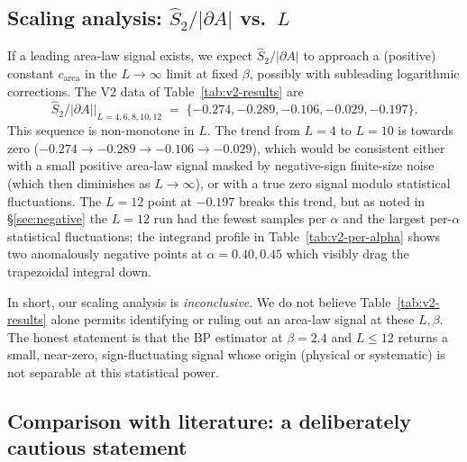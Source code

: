 \documentclass[11pt,a4paper]{article}
\theoremstyle{definition}
\begin{document}
\subsection{Scaling analysis: $\widehat S_2/|\partial A|$ vs.\ $L$}
\label{sec:scaling-v2}

If a leading area-law signal exists, we expect $\widehat
S_2/|\partial A|$ to approach a (positive) constant $c_{\mathrm{area}}$
in the $L \to \infty$ limit at fixed $\beta$, possibly with
subleading logarithmic corrections. The V2 data of
Table~\ref{tab:v2-results} are
\begin{equation}
   \widehat S_2/|\partial A|\big|_{L=4,6,8,10,12}
   \;=\; \{-0.274, -0.289, -0.106, -0.029, -0.197\}.
\end{equation}
This sequence is non-monotone in $L$. The trend from $L = 4$ to
$L = 10$ is towards zero ($-0.274 \to -0.289 \to -0.106 \to -0.029$),
which would be consistent either with a small positive area-law
signal masked by negative-sign finite-size noise (which then
diminishes as $L \to \infty$), or with a true zero signal modulo
statistical fluctuations. The $L = 12$ point at $-0.197$ breaks this
trend, but as noted in \S\ref{sec:negative} the $L = 12$ run had the
fewest samples per $\alpha$ and the largest per-$\alpha$ statistical
fluctuations; the integrand profile in Table~\ref{tab:v2-per-alpha}
shows two anomalously negative points at $\alpha = 0.40, 0.45$ which
visibly drag the trapezoidal integral down.

In short, our scaling analysis is \emph{inconclusive}. We do not
believe Table~\ref{tab:v2-results} alone permits identifying or
ruling out an area-law signal at these $L, \beta$. The honest
statement is that the BP estimator at $\beta = 2.4$ and $L \le 12$
returns a small, near-zero, sign-fluctuating signal whose origin
(physical or systematic) is not separable at this statistical power.

\subsection{Comparison with literature: a deliberately cautious
            statement}
\label{sec:lit-compare}
\end{document}
